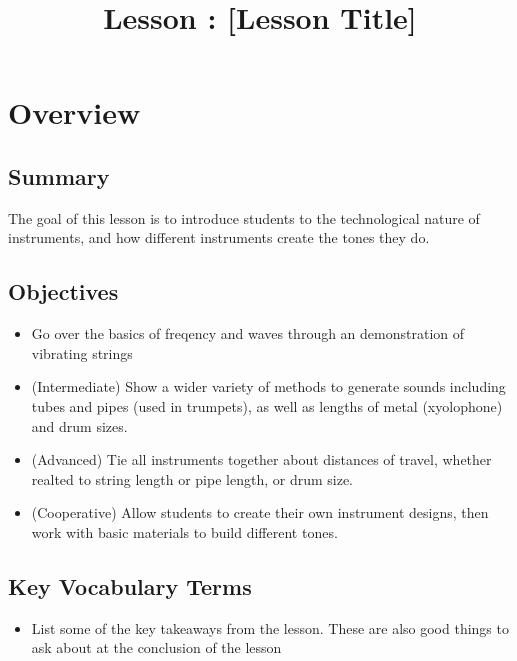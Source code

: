 \documentclass{lessonplan}
\title{Lesson \lessonNumber: [Lesson Title]}
\author{\linkHome}
\date{}
\begin{document}
  \maketitle

  \section{Overview}
    \subsection{Summary}
      The goal of this lesson is to introduce students to the technological nature of instruments,
       and how different instruments create the tones they do. 
    \subsection{Objectives}
    \begin{itemize}
      \item Go over the basics of freqency and waves through an demonstration of vibrating strings
      \item (Intermediate) Show a wider variety of methods to generate sounds including tubes and pipes (used in trumpets), as well as lengths of metal (xyolophone) and drum sizes.
      \item (Advanced) Tie all instruments together about distances of travel, whether realted to string length or pipe length, or drum size.
      \item (Cooperative) Allow students to create their own instrument designs, then work with basic materials to build different tones. 

    \end{itemize}
    \subsection{Key Vocabulary Terms}
    \begin{itemize}
      \item List some of the key takeaways from the lesson.  These are
        also good things to ask about at the conclusion of the lesson
      \item Pitch, Higher Pitch, Lower Pitch
      \item (Intermediate) Hertz, Frequency
      \item (Advanced) Period
    \end{itemize}
\end{document}
